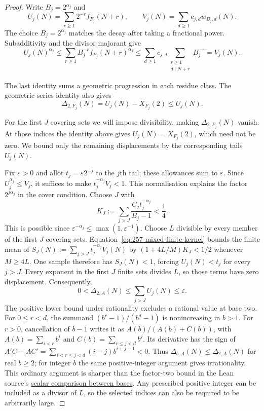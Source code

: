 \documentclass[11pt]{article}
\theoremstyle{plain}
\theoremstyle{definition}
\theoremstyle{remark}
\begin{document}
\begin{proof}
Write $B_j=2^{\alpha_j}$ and
\[
 U_j(N)=\sum_{r\ge1}2^{-r}f_{F_j}(N+r),\qquad
 V_j(N)=\sum_{d\ge1}c_{j,d}w_{B_j,d}(N).
\]
The choice $B_j=2^{\alpha_j}$ matches the decay after taking a
fractional power.  Subadditivity and the divisor majorant give
\[
 U_j(N)^{\alpha_j}
 \le\sum_{r\ge1}B_j^{-r}f_{F_j}(N+r)^{\alpha_j}
 \le\sum_{d\ge1}c_{j,d}
       \sum_{\substack{r\ge1\\d\mid N+r}}B_j^{-r}
 =V_j(N).
\]
\par\noindent
\begin{minipage}{\linewidth}
The last identity sums a geometric progression in each residue class.
The geometric-series identity also gives
\[
 \Delta_{2,F_j}(N)=U_j(N)-X_{F_j}(2)\le U_j(N).
\]
\end{minipage}
\par
For the first $J$ covering sets we will impose divisibility, making
$\Delta_{2,F_j}(N)$ vanish. At those indices the identity above gives
$U_j(N)=X_{F_j}(2)$, which need not be zero. We bound only the remaining
displacements by the corresponding tails $U_j(N)$.

Fix $\varepsilon>0$ and allot $t_j=\varepsilon2^{-j}$ to the $j$th tail;
these allowances sum to $\varepsilon$. Since $U_j^{\alpha_j}\le V_j$,
it suffices to make $t_j^{-\alpha_j}V_j<1$. This normalisation explains
the factor $2^{j\alpha_j}$ in the cover condition. Choose $J$ with
\[
 K_J:=\sum_{j>J}\frac{C_jt_j^{-\alpha_j}}{B_j-1}<\frac14.
\]
This is possible since $\varepsilon^{-\alpha_j}\le\max(1,\varepsilon^{-1})$.
Choose $L$ divisible by every member of the first $J$ covering sets.  Equation~\eqref{eq:257-mixed-finite-kernel} bounds the finite mean of
$S_J(N):=\sum_{j>J}t_j^{-\alpha_j}V_j(N)$ by
$(1+4L/M)K_J<1/2$ whenever $M\ge4L$.
One sample therefore has $S_J(N)<1$, forcing $U_j(N)<t_j$ for every $j>J$.
Every exponent in the first $J$ finite sets divides $L$, so those terms
have zero displacement.  Consequently,
\[
 0<\Delta_{2,A}(N)\le\sum_{j>J}U_j(N)\le\varepsilon.
\]
The positive lower bound under rationality excludes a rational value
at base two. For $0\le r<d$, the summand $(b^r-1)/(b^d-1)$ is nonincreasing
in $b>1$.  For $r>0$, cancellation of $b-1$ writes it as
$A(b)/(A(b)+C(b))$, with $A(b)=\sum_{i<r}b^i$ and
$C(b)=\sum_{r\le j<d}b^j$.  Its derivative has the sign of
$A'C-AC'=\sum_{i<r\le j<d}(i-j)b^{i+j-1}<0$.
Thus $\Delta_{b,A}(N)\le\Delta_{2,A}(N)$ for real $b\ge2$;
for integer $b$ the same positive-integer argument gives irrationality.
This ordinary argument is sharper than the factor-two bound in the Lean
source's
\href{https://github.com/wcook04/plectis-erdos-lean/blob/52f29ad173b04e3bac941b3663f2b9aebe5de0bb/ErdosProblems/Erdos257/PaperCompleteR7/CoverKernel.lean#L232}{scalar comparison between bases}.
Any prescribed positive integer can be included as a divisor of $L$,
so the selected indices can also be required to be arbitrarily large.
\end{proof}
\end{document}
